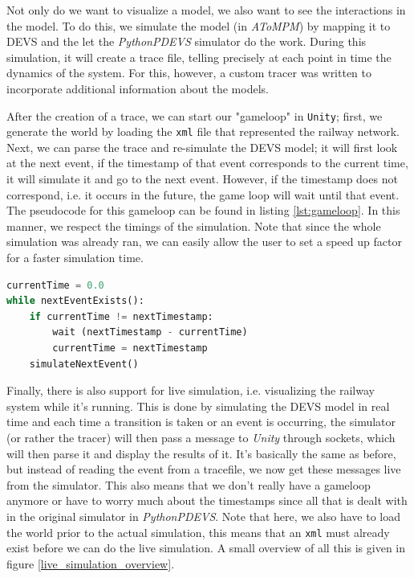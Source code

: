 \documentclass{article}
\begin{document}
Not only do we want to visualize a model, we also want to see the interactions in the model. To do this, we simulate the model (in \textit{AToMPM}) by mapping it to DEVS and the let the \textit{PythonPDEVS} simulator do the work. During this simulation, it will create a trace file, telling precisely at each point in time the dynamics of the system. For this, however, a custom tracer was written to incorporate additional information about the models.

After the creation of a trace, we can start our "gameloop" in \texttt{Unity}; first, we generate the world by loading the \texttt{xml} file that represented the railway network. Next, we can parse the trace and re-simulate the DEVS model; it will first look at the next event, if the timestamp of that event corresponds to the current time, it will simulate it and go to the next event. However, if the timestamp does not correspond, i.e. it occurs in the future, the game loop will wait until that event. The pseudocode for this gameloop can be found in listing \ref{lst:gameloop}. In this manner, we respect the timings of the simulation. Note that since the whole simulation was already ran, we can easily allow the user to set a speed up factor for a faster simulation time.

\begin{lstlisting}[language=python, caption=Pseudocode Gameloop, label={lst:gameloop}]
currentTime = 0.0
while nextEventExists():
    if currentTime != nextTimestamp:
        wait (nextTimestamp - currentTime)
        currentTime = nextTimestamp
    simulateNextEvent()
\end{lstlisting}

Finally, there is also support for live simulation, i.e. visualizing the railway system while it's running. This is done by simulating the DEVS model in real time and each time a transition is taken or an event is occurring, the simulator (or rather the tracer) will then pass a message to \textit{Unity} through sockets, which will then parse it and display the results of it. It's basically the same as before, but instead of reading the event from a tracefile, we now get these messages live from the simulator. This also means that we don't really have a gameloop anymore or have to worry much about the timestamps since all that is dealt with in the original simulator in \textit{PythonPDEVS}. Note that here, we also have to load the world prior to the actual simulation, this means that an \texttt{xml} must already exist before we can do the live simulation. A small overview of all this is given in figure \ref{live_simulation_overview}.
\end{document}
